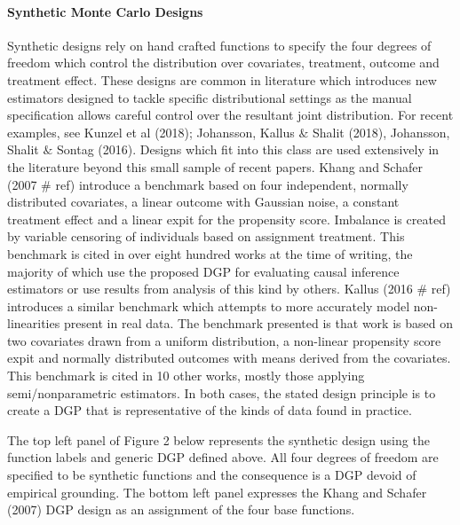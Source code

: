 \documentclass[../main.tex]{subfiles}
\begin{document}
\vspace{\baselineskip}
\paragraph*{Synthetic Monte Carlo Designs}\par


\vspace{\baselineskip}
Synthetic designs rely on hand crafted functions to specify the four degrees of freedom which control the distribution over covariates, treatment, outcome and treatment effect. These designs are common in literature which introduces new estimators designed to tackle specific distributional settings as the manual specification allows careful control over the resultant joint distribution. For recent examples, see Kunzel et al (2018); Johansson, Kallus $\&$  Shalit (2018), Johansson, Shalit $\&$  Sontag (2016). Designs which fit into this class are used extensively in the literature beyond this small sample of recent papers. Khang and Schafer (2007 $\#$ ref) introduce a benchmark based on four independent, normally distributed covariates, a linear outcome with Gaussian noise, a constant treatment effect and a linear expit for the propensity score. Imbalance is created by variable censoring of individuals based on assignment treatment. This benchmark is cited in over eight hundred works at the time of writing, the majority of which use the proposed DGP for evaluating causal inference estimators or use results from analysis of this kind by others. Kallus (2016 $\#$ ref) introduces a similar benchmark which attempts to more accurately model non-linearities present in real data. The benchmark presented is that work is based on two covariates drawn from a uniform distribution, a non-linear propensity score expit and normally distributed outcomes with means derived from the covariates. This benchmark is cited in 10 other works, mostly those applying semi/nonparametric estimators. In both cases, the stated design principle is to create a DGP that is representative of the kinds of data found in practice.\par


\vspace{\baselineskip}
The top left panel of Figure 2 below represents the synthetic design using the function labels and generic DGP defined above. All four degrees of freedom are specified to be synthetic functions and the consequence is a DGP devoid of empirical grounding. The bottom left panel expresses the Khang and Schafer (2007) DGP design as an assignment of the four base functions.\par
\end{document}
